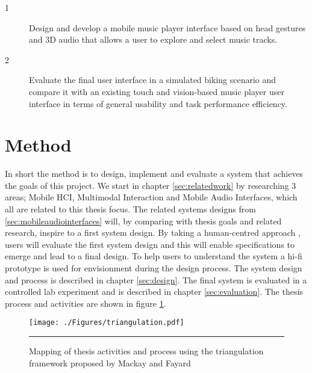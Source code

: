 

\begin{description}
\item[1] Design and develop a mobile music player interface based on head gestures and 3D audio that allows a user to explore and select music tracks.
\item[2] Evaluate the final user interface in a simulated biking scenario and compare it with an existing touch and vision-based music player user interface in terms of general usability and task performance efficiency.
\end{description}


\section{Method}
In short the method is to design, implement and evaluate a system that achieves the goals of this project. We start in chapter \ref{sec:relatedwork} by researching 3 areas; Mobile HCI, Multimodal Interaction and Mobile Audio Interfaces, which all are related to this thesis focus. The related systems designs from \ref{sec:mobileaudiointerfaces} will, by comparing with thesis goals and related research, inspire to a first system design. By taking a human-centred approach \cite{benyon_designing_2010}, users will evaluate the first system design and this will enable specifications to emerge and lead to a final design. To help users to understand the system a hi-fi prototype is used for envisionment \cite{benyon_designing_2010} during the design process. The system design and process is described in chapter \ref{sec:design}. The final system is evaluated in a controlled lab experiment and is described in chapter \ref{sec:evaluation}. The thesis process and activities are shown in figure \ref{fig:triangulation}.

\begin{figure}[t]
	\centering
		\texttt{[image: ./Figures/triangulation.pdf]}
		\rule{35em}{0.5pt}
	\caption[Triangulation]{Mapping of thesis activities and process using the triangulation framework proposed by Mackay and Fayard \cite{mackay_hci_1997}}
	\label{fig:triangulation}
\end{figure}








